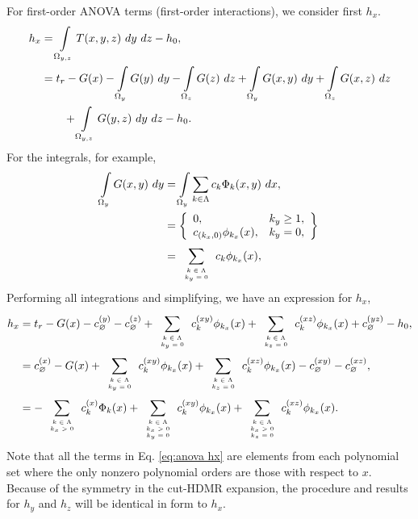 For first-order ANOVA terms (first-order interactions), we consider first $h_x$.
\begin{align}
  h_x &= \int\limits_{\Omega_{y,z}} T(x,y,z)\ dy\ dz - h_0, \\ \nonumber
  &= t_r - G(x) - \int\limits_{\Omega_{y}} G(y)\ dy - \int\limits_{\Omega_{z}} G(z)\ dz + \int\limits_{\Omega_{y}} G(x,y)\ dy + \int\limits_{\Omega_{z}} G(x,z)\ dz \\ \nonumber
  & \hspace{20pt}+ \int\limits_{\Omega_{y,z}} G(y,z)\ dy\ dz - h_0.
\end{align}
For the integrals, for example,
\begin{align}
  \int\limits_{\Omega_{y}} G(x,y)\ dy &= \int\limits_{\Omega_{y}} \sum_{k\in\Lambda} c_k\Phi_k(x,y)\ dx, \\ \nonumber
    &= \left\{\begin{array}{lr}
          0, & k_y \geq 1,\\
          c_{(k_x,0)}\phi_{k_x}(x), & k_y = 0,
       \end{array} \right\} \\ \nonumber
      &= \sum_{\tiny\begin{array}{c}k\in\Lambda\\k_y=0\end{array}}^{} c_k\phi_{k_x}(x),
\end{align}
Performing all integrations and simplifying, we have an expression for $h_x$,
\begin{align}\label{eq:anova hx}
  h_x &= t_r - G(x) - c^{(y)}_\varnothing - c^{(z)}_\varnothing + \sum_{\tiny\begin{array}{c}k\in\Lambda\\k_y=0\end{array}}^{} c^{(xy)}_k\phi_{k_x}(x) +
  \sum_{\tiny\begin{array}{c}k\in\Lambda\\k_z=0\end{array}}^{} c^{(xz)}_k\phi_{k_x}(x) + c^{(yz)}_\varnothing - h_0,\\ \nonumber
  &= c^{(x)}_\varnothing - G(x) + \sum_{\tiny\begin{array}{c}k\in\Lambda\\k_y=0\end{array}}^{} c^{(xy)}_k\phi_{k_x}(x) +
  \sum_{\tiny\begin{array}{c}k\in\Lambda\\k_z=0\end{array}}^{} c^{(xz)}_k\phi_{k_x}(x) - c^{(xy)}_\varnothing -
        c^{(xz)}_\varnothing, \\ \nonumber
  &= -\sum_{\tiny\begin{array}{c}k\in\Lambda\\k_x>0\end{array}}^{} c^{(x)}_k\Phi_k(x) + \sum_{\tiny\begin{array}{c}k\in\Lambda\\k_x>0\\k_y=0\end{array}}^{} c^{(xy)}_k\phi_{k_x}(x) +
  \sum_{\tiny\begin{array}{c}k\in\Lambda\\k_x>0\\k_z=0\end{array}}^{} c^{(xz)}_k\phi_{k_x}(x).
\end{align}
Note that all the terms in Eq. \ref{eq:anova hx} are elements from each polynomial set where the only nonzero polynomial
orders are those with respect to $x$.  Because of the symmetry in the cut-HDMR expansion, the procedure and
results for $h_y$ and $h_z$ will be identical in form to $h_x$.

